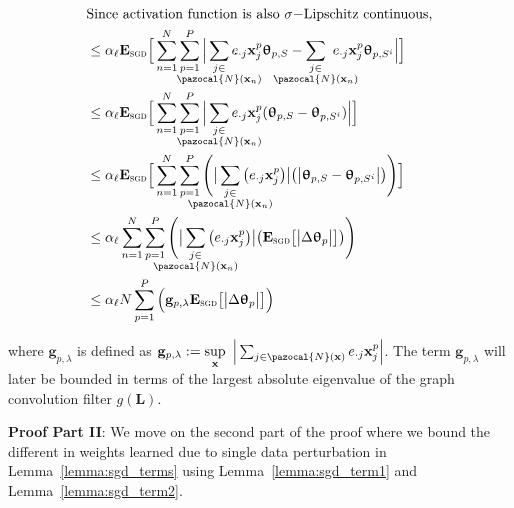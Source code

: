 \documentclass{article}
\newcommand{\Na}{\pazocal{N}}
\begin{document}
\begin{equation*} 
\begin{split}
& \text{Since activation function is also $\sigma-$Lipschitz  continuous,} \\
&   \leq \alpha_{\ell} \mathbf{E}_{\textsc{sgd}}\Big[  \sum_{n=1}^{N} \sum_{p=1}^{P} \Big|    \sum_{\mathclap{\substack{j\in \\ \Na(\mathbf{x}_n)}}} e_{\cdot j} \mathbf{x}^{p}_{j} \bm{\uptheta}_{p,S}    -   \sum_{\mathclap{\substack{j \in \\ \Na(\mathbf{x}_n)}}} \  e_{\cdot j}   \mathbf{x}^{p}_{j} \bm{\uptheta}_{p, S^{i}}  \Big|\Big]   \\
& \leq \alpha_{\ell} \mathbf{E}_{\textsc{sgd}}\Big[ \sum_{n=1}^{N}\sum_{p=1}^{P} \Big|   \sum_{\mathclap{\substack{j\in \\ \Na(\mathbf{x}_n)}}} e_{\cdot j} \mathbf{x}^{p}_{j} (\bm{\uptheta}_{p, S}    -  \bm{\uptheta}_{p, S^{i}} )  \Big|\Big]   \\
& \leq \alpha_{\ell} \mathbf{E}_{\textsc{sgd}}\Big[ \sum_{n=1}^{N}\sum_{p=1}^{P} \Bigg( \big|\sum_{\mathclap{\substack{j \in \\ \Na(\mathbf{x}_n)}}} \big( e_{\cdot j }  \mathbf{x}^{p}_{j}  \big)\big| \big(\big|\bm{\uptheta}_{p,S}  - \bm{\uptheta}_{p,S^{i}} \big|\big) \Bigg) \Big]   \\
& \leq \alpha_{\ell} \sum_{n=1}^{N} \sum_{p=1}^{P} \Bigg( \big| \sum_{\mathclap{\substack{j \in \\ \Na(\mathbf{x}_n)}}} \big( e_{\cdot j }  \mathbf{x}^{p}_{j}  \big)\big| \big( \mathbf{E}_{\textsc{sgd}}\big[\big|\Delta \bm{\uptheta}_{p} \big|\big]   \big)    \Bigg)  \\
& \leq \alpha_{\ell} N\sum_{p=1}^{P} \Big( \mathbf{g}_{p,\lambda}   \mathbf{E}_{\textsc{sgd}}\big[\big|\Delta \bm{\uptheta}_{p} \big|\big]  \Big)    \\
\end{split}
\end{equation*}

where  
$\mathbf{g}_{p,\lambda}$ is defined as $  \mathbf{g}_{p,\lambda}:=\underset{\mathbf{x}}{\sup}  \hspace{0.5em} \Big|\sum_{j \in  \Na(\mathbf{x})}   e_{\cdot j }  \mathbf{x}^{p}_{j}  \Big| $.
The term $\mathbf{g}_{p,\lambda}$ will later be bounded in terms of the largest absolute eigenvalue of the graph convolution filter $g(\mathbf{L})$.  

\noindent \textbf{Proof Part II}:   We move on the second part of the proof where we bound the different in weights learned due to single data perturbation in Lemma~\ref{lemma:sgd_terms} using Lemma~\ref{lemma:sgd_term1} and Lemma~\ref{lemma:sgd_term2}. 
\end{document}
